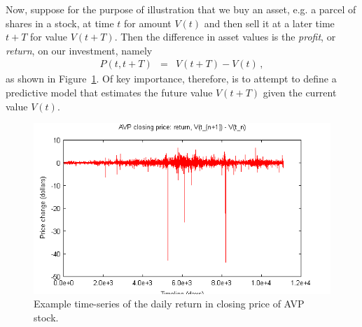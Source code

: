\documentclass[a4paper]{book}
\begin{document}
Now, suppose for the purpose of illustration that
we buy an asset, e.g. a parcel of shares in a stock, at time $t$ for amount $V(t)$ and then sell it at a later
time $t+T$ for value $V(t+T)$. Then the difference in asset values is the
{\em profit}, or {\em return}, on our investment, namely
\begin{eqnarray}
  P(t,t+T) & = & V(t+T)-V(t)\,,
\end{eqnarray}
as shown in Figure~\ref{fig:avp-price-diff}.
Of key importance, therefore, is to attempt to define a predictive model
that estimates the future value $V(t+T)$ given the current value $V(t)$.
\begin{figure}[hbt]
\includegraphics[scale=0.8]{figures/avp-price-close-diff.png}
\caption{Example time-series of the daily return in closing price
of AVP stock.}
\label{fig:avp-price-diff}
\end{figure}
\end{document}
